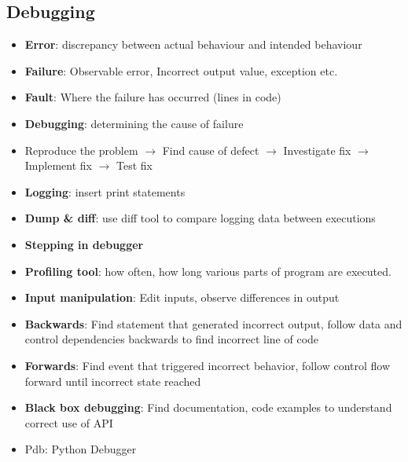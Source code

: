 \documentclass[a4paper]{article}
\begin{document}
\subsection{Debugging}
\begin{itemize}
    \item \textbf{Error}: discrepancy between actual behaviour and intended behaviour
    \item \textbf{Failure}: Observable error, Incorrect output value, exception etc.
    \item \textbf{Fault}: Where the failure has occurred (lines in code)
    \item \textbf{Debugging}: determining the cause of failure
    \item Reproduce the problem $\to$ Find cause of defect $\to$ Investigate fix $\to$ Implement fix $\to$ Test fix
    \item \textbf{Logging}: insert print statements
    \item \textbf{Dump \& diff}: use diff tool to compare logging data between executions
    \item \textbf{Stepping in debugger}
    \item \textbf{Profiling tool}: how often, how long various parts of program are executed.
    \item \textbf{Input manipulation}: Edit inputs, observe differences in output
    \item \textbf{Backwards}: Find statement that generated incorrect output, follow data and control dependencies backwards to find incorrect line of code
    \item \textbf{Forwards}: Find event that triggered incorrect behavior, follow control flow forward until incorrect state reached
    \item \textbf{Black box debugging}: Find documentation, code examples to understand correct use of API
    \item Pdb: Python Debugger
\end{itemize}
\end{document}
